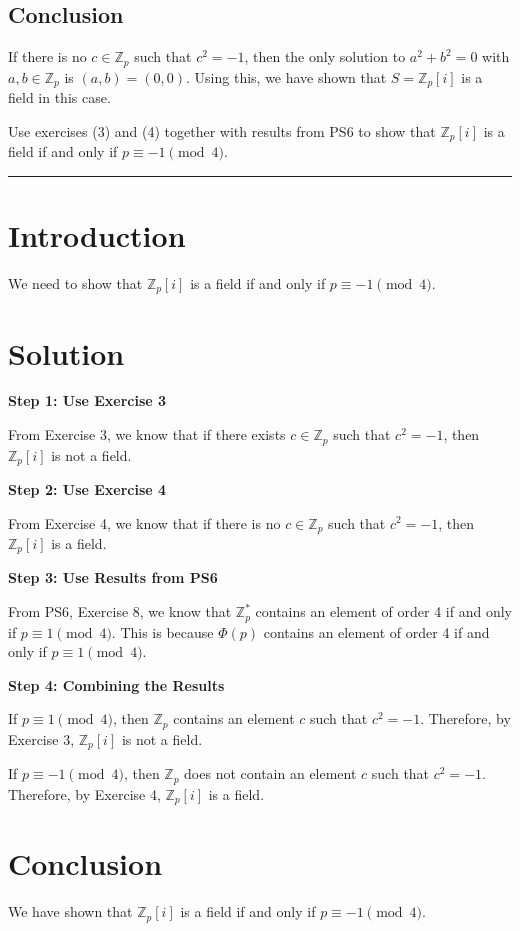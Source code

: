 \documentclass[12pt]{amsart}
\theoremstyle{definition}
\numberwithin{equation}{section}
\newcommand{\Z}{\mathbb{Z}}
\begin{document}
\begin{exercise}{4}
    \section*{Conclusion}
    If there is no \(c \in \Z_p\) such that \(c^2 = -1\), then the only solution to \(a^2 + b^2 = 0\) with \(a, b \in \Z_p\) is \((a, b) = (0, 0)\). Using this, we have shown that \(S = \Z_p[i]\) is a field in this case.

\end{exercise}
\newpage
\begin{exercise}{5} Use exercises (3) and (4) together with results from PS6 to show that \(\Z_p[i]\) is a field if and only if \(p\equiv -1\pmod 4\).

    \noindent\rule{\linewidth}{1pt}

    \section*{Introduction}
    We need to show that \(\Z_p[i]\) is a field if and only if \(p \equiv -1 \pmod{4}\).

    \section*{Solution}
    \noindent \textbf{Step 1: Use Exercise 3}

    From Exercise 3, we know that if there exists \(c \in \Z_p\) such that \(c^2 = -1\), then \(\Z_p[i]\) is not a field.

    \noindent \textbf{Step 2: Use Exercise 4}

    From Exercise 4, we know that if there is no \(c \in \Z_p\) such that \(c^2 = -1\), then \(\Z_p[i]\) is a field.

    \noindent \textbf{Step 3: Use Results from PS6}

    From PS6, Exercise 8, we know that \(\Z_p^*\) contains an element of order 4 if and only if \(p \equiv 1 \pmod{4}\). This is because \(\Phi(p)\) contains an element of order 4 if and only if \(p \equiv 1 \pmod{4}\).

    \noindent \textbf{Step 4: Combining the Results}

    If \(p \equiv 1 \pmod{4}\), then \(\Z_p\) contains an element \(c\) such that \(c^2 = -1\). Therefore, by Exercise 3, \(\Z_p[i]\) is not a field.

    If \(p \equiv -1 \pmod{4}\), then \(\Z_p\) does not contain an element \(c\) such that \(c^2 = -1\). Therefore, by Exercise 4, \(\Z_p[i]\) is a field.

    \section*{Conclusion}
    We have shown that \(\Z_p[i]\) is a field if and only if \(p \equiv -1 \pmod{4}\).

\end{exercise}
\end{document}
